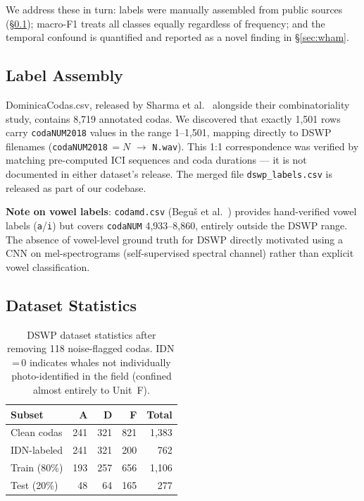 \documentclass[9pt,a4paper,twocolumn,twoside]{rho-class/rho}
\begin{document}
We address these in turn: labels were manually assembled from public sources (§\ref{subsec:assembly}); macro-F1 treats all classes equally regardless of frequency; and the temporal confound is quantified and reported as a novel finding in §\ref{sec:wham}.

\subsection{Label Assembly}
\label{subsec:assembly}

DominicaCodas.csv, released by Sharma et al.\ \cite{sharma2024combinatorial} alongside their combinatoriality study, contains 8,719 annotated codas. We discovered that exactly 1,501 rows carry \texttt{codaNUM2018} values in the range 1--1,501, mapping directly to DSWP filenames (\texttt{codaNUM2018}\,$=N$ $\rightarrow$ \texttt{N.wav}). This 1:1 correspondence was verified by matching pre-computed ICI sequences and coda durations --- it is not documented in either dataset's release. The merged file \texttt{dswp\_labels.csv} is released as part of our codebase.

\textbf{Note on vowel labels}: \texttt{codamd.csv} (Beguš et al.\ \cite{begus2024vowels}) provides hand-verified vowel labels (\texttt{a}/\texttt{i}) but covers \texttt{codaNUM} 4,933--8,860, entirely outside the DSWP range. The absence of vowel-level ground truth for DSWP directly motivated using a CNN on mel-spectrograms (self-supervised spectral channel) rather than explicit vowel classification.

\subsection{Dataset Statistics}

\begin{table}[H]
\centering
\caption{DSWP dataset statistics after removing 118 noise-flagged codas. IDN\,=\,0 indicates whales not individually photo-identified in the field (confined almost entirely to Unit~F).}
\label{tab:dataset}
\small
\begin{tabular}{lrrrr}
\toprule
\textbf{Subset} & \textbf{A} & \textbf{D} & \textbf{F} & \textbf{Total}\\
\midrule
Clean codas  & 241 & 321 & 821 & 1,383 \\
IDN-labeled  & 241 & 321 & 200 & 762 \\
\midrule
Train (80\%) & 193 & 257 & 656 & 1,106 \\
Test  (20\%) &  48 &  64 & 165 &   277 \\
\bottomrule
\end{tabular}
\end{table}
\end{document}
